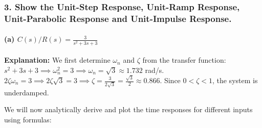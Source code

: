 \documentclass{article}
\begin{document}
	\subsubsection*{3. Show the Unit-Step Response, Unit-Ramp Response, Unit-Parabolic Response and Unit-Impulse Response.}
	
	\paragraph{(a) $C(s)/R(s) = \frac{3}{s^2+3s+3}$}
	\textbf{Explanation:}
	We first determine $\omega_n$ and $\zeta$ from the transfer function:
	$s^2+3s+3 \implies \omega_n^2 = 3 \implies \omega_n = \sqrt{3} \approx 1.732$ rad/s.
	$2\zeta\omega_n = 3 \implies 2\zeta\sqrt{3} = 3 \implies \zeta = \frac{3}{2\sqrt{3}} = \frac{\sqrt{3}}{2} \approx 0.866$.
	Since $0 < \zeta < 1$, the system is underdamped.
	
	We will now analytically derive and plot the time responses for different inputs using formulas:
	
\end{document}
